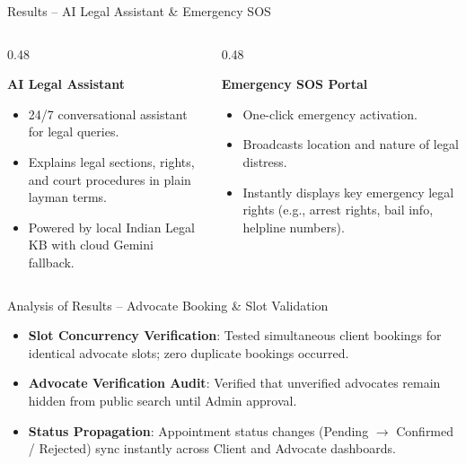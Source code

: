 \documentclass[10pt,aspectratio=169]{beamer}
\begin{document}
\begin{frame}{Results -- AI Legal Assistant \& Emergency SOS}
  \begin{columns}[T]
    \begin{column}{0.48\textwidth}
      \begin{block}{\textbf{AI Legal Assistant}}
        \begin{itemize}
          \item 24/7 conversational assistant for legal queries.
          \item Explains legal sections, rights, and court procedures in plain layman terms.
          \item Powered by local Indian Legal KB with cloud Gemini fallback.
        \end{itemize}
      \end{block}
    \end{column}

    \begin{column}{0.48\textwidth}
      \begin{block}{\textbf{Emergency SOS Portal}}
        \begin{itemize}
          \item One-click emergency activation.
          \item Broadcasts location and nature of legal distress.
          \item Instantly displays key emergency legal rights (e.g., arrest rights, bail info, helpline numbers).
        \end{itemize}
      \end{block}
    \end{column}
  \end{columns}
\end{frame}

\begin{frame}{Analysis of Results -- Advocate Booking \& Slot Validation}
  \begin{itemize}
    \setlength{\itemsep}{10pt}
    \item \textbf{Slot Concurrency Verification}: Tested simultaneous client bookings for identical advocate slots; zero duplicate bookings occurred.
    \item \textbf{Advocate Verification Audit}: Verified that unverified advocates remain hidden from public search until Admin approval.
    \item \textbf{Status Propagation}: Appointment status changes (Pending $\rightarrow$ Confirmed / Rejected) sync instantly across Client and Advocate dashboards.
  \end{itemize}
\end{frame}
\end{document}
